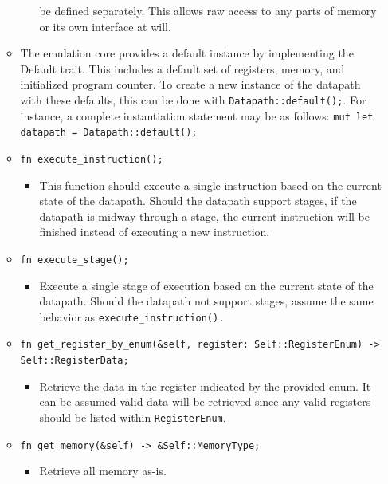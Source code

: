 \documentclass[parskip=half, fontsize=12pt]{scrartcl}
\providecommand{\tightlist}{%
  \setlength{\itemsep}{0pt}\setlength{\parskip}{0pt}}
\begin{document}
\begin{itemize}
\begin{itemize}
\begin{itemize}
            be defined separately. This allows raw access to any parts of
            memory or its own interface at will.
        \end{itemize}
        \item The emulation core provides a default instance by implementing the
            Default trait. This includes a default set of registers, memory, and
            initialized program counter. To create a new instance of the
            datapath with these defaults, this can be done with
            \texttt{Datapath::default();}. For instance, a complete instantiation
            statement may be as follows: \texttt{mut let datapath = Datapath::default();}
        \item \texttt{fn execute\_instruction();}
        \begin{itemize}
            \tightlist
            \item This function should execute a single instruction based on the
            current state of the datapath. Should the datapath support stages,
            if the datapath is midway through a stage, the current instruction
            will be finished instead of executing a new instruction.
        \end{itemize}
        \item \texttt{fn execute\_stage();}
        \begin{itemize}
            \tightlist
            \item Execute a single stage of execution based on the current state of
            the datapath. Should the datapath not support stages, assume the
            same behavior as \texttt{execute\_instruction().}
        \end{itemize}
        \item \texttt{fn get\_register\_by\_enum(\&self, register: Self::RegisterEnum) -\textgreater{} Self::RegisterData;}
        \begin{itemize}
            \tightlist
            \item Retrieve the data in the register indicated by the provided enum.
            It can be assumed valid data will be retrieved since any valid
            registers should be listed within \texttt{RegisterEnum}.
        \end{itemize}
        \item \texttt{fn get\_memory(\&self) -\textgreater{} \&Self::MemoryType;}
        \begin{itemize}
            \tightlist
            \item Retrieve all memory as-is.
        \end{itemize}
    \end{itemize}


\end{itemize}
\end{document}
